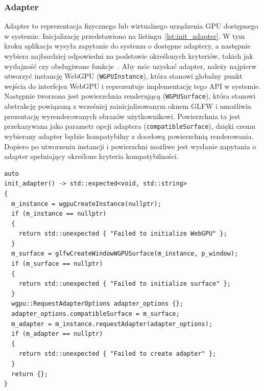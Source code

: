 \subsubsection{Adapter}
Adapter to reprezentacja fizycznego lub wirtualnego urządzenia GPU dostępnego w systemie. Inicjalizację przedstawiono na listingu~\ref{lst:init_adapter}. W tym kroku aplikacja wysyła zapytanie do systemu o dostępne adaptery, a następnie wybiera najbardziej odpowiedni na podstawie określonych kryteriów, takich jak wydajność czy obsługiwane funkcje~\cite{WebGPU-draft}. Aby móc uzyskać adapter, należy najpierw utworzyć instancję WebGPU (\texttt{WGPUInstance}), która stanowi globalny punkt wejścia do interfejsu WebGPU i reprezentuje implementację tego API w systemie. Następnie tworzona jest powierzchnia renderującą (\texttt{WGPUSurface}), która stanowi abstrakcję powiązaną z wcześniej zainicjalizowanym oknem GLFW i umożliwia prezentację wyrenderowanych obrazów użytkownikowi. Powierzchnia ta jest przekazywana jako parametr opcji adaptera (\texttt{compatibleSurface}), dzięki czemu wybierany adapter będzie kompatybilny z docelową powierzchnią renderowania. Dopiero po utworzeniu instancji i powierzchni możliwe jest wysłanie zapytania o adapter spełniający określone kryteria kompatybilności.
\begin{lstlisting}[caption={Funkcja inicjalizująca obiekt adapter}, label={lst:init_adapter}]
auto
init_adapter() -> std::expected<void, std::string>
{
  m_instance = wgpuCreateInstance(nullptr);
  if (m_instance == nullptr)
  {
    return std::unexpected { "Failed to initialize WebGPU" };
  }
  m_surface = glfwCreateWindowWGPUSurface(m_instance, p_window);
  if (m_surface == nullptr)
  {
    return std::unexpected { "Failed to initialize surface" };
  }
  wgpu::RequestAdapterOptions adapter_options {};
  adapter_options.compatibleSurface = m_surface;
  m_adapter = m_instance.requestAdapter(adapter_options);
  if (m_adapter == nullptr)
  {
    return std::unexpected { "Failed to create adapter" };
  }
  return {};
}
\end{lstlisting}

